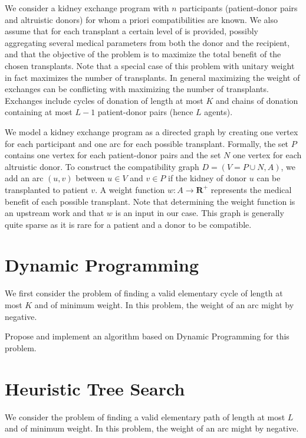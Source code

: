 \documentclass[a4paper,twocolumn]{article}
\newcommand{\R}{\mathbf{R}}
\begin{document}
We consider a kidney exchange program with $n$ participants (patient-donor pairs and altruistic donors) for whom a priori compatibilities are known. We also assume that for each transplant a certain level of  is provided, possibly aggregating several medical parameters from both the donor and the recipient, and that the objective of the problem is to maximize the total benefit of the chosen transplants. Note that a special case of this problem with unitary weight in fact maximizes the number of transplants. In general maximizing the weight of exchanges can be conflicting with maximizing the number of transplants. Exchanges include cycles of donation of length at most $K$ and chains of donation containing at most $L - 1$ patient-donor pairs (hence $L$ agents).

We model a kidney exchange program as a directed graph by creating one vertex for each participant and one arc for each possible transplant. Formally, the set $P$ contains one vertex for each patient-donor pairs and the set $N$ one vertex for each altruistic donor. To construct the compatibility graph $D = (V = P \cup N, A)$, we add an arc $(u, v)$ between $u \in V$ and $v \in P$ if the kidney of donor $u$ can be transplanted to patient $v$. A weight function $w: A \to \R^+$ represents the medical benefit of each possible transplant. Note that determining the weight function is an upstream work and that $w$ is an input in our case. This graph is generally quite sparse as it is rare for a patient and a donor to be compatible.

\section{Dynamic Programming}

We first consider the problem of finding a valid elementary cycle of length at most $K$ and of minimum weight. In this problem, the weight of an arc might by negative.

Propose and implement an algorithm based on Dynamic Programming for this problem.

\section{Heuristic Tree Search}

We consider the problem of finding a valid elementary path of length at most $L$ and of minimum weight. In this problem, the weight of an arc might by negative.
\end{document}
